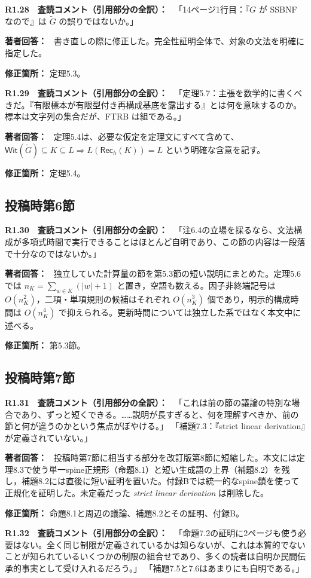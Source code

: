 \documentclass[10pt,a4paper]{ltjsarticle}
\newcommand{\Comment}[1]{\par\medskip\noindent\textbf{#1　査読コメント（引用部分の全訳）：}\ }
\newcommand{\Reply}{\par\noindent\textbf{著者回答：}\ }
\newcommand{\Location}[1]{\par\noindent\textbf{修正箇所：} #1\par}
\newcommand{\Bh}{\mathsf{Rec}_h}
\begin{document}
\Comment{R1.28}
「14ページ1行目：『$G$ が SSBNF なので』は $\widetilde G$ の誤りではないか。」

\Reply
書き直しの際に修正した。完全性証明全体で、対象の文法を明確に指定した。
\Location{定理5.3。}

\Comment{R1.29}
「定理5.7：主張を数学的に書くべきだ。『有限標本が有限型付き再構成基底を露出する』とは何を意味するのか。標本は文字列の集合だが、FTRB は組である。」

\Reply
定理5.4は、必要な仮定を定理文にすべて含めて、
$\mathsf{Wit}(\widetilde G)\subseteq K\subseteq L
\Longrightarrow L(\Bh(K))=L$
という明確な含意を記す。
\Location{定理5.4。}

\subsection*{投稿時第6節}
\Comment{R1.30}
「注6.4の立場を採るなら、文法構成が多項式時間で実行できることはほとんど自明であり、この節の内容は一段落で十分なのではないか。」

\Reply
独立していた計算量の節を第5.3節の短い説明にまとめた。定理5.6では $n_K=\sum_{w\in K}(|w|+1)$ と置き，空語も数える。因子非終端記号は $O(n_K^2)$，二項・単項規則の候補はそれぞれ $O(n_K^3)$ 個であり，明示的構成時間は $O(n_K^4)$ で抑えられる。更新時間については独立した系ではなく本文中に述べる。
\Location{第5.3節。}




\subsection*{投稿時第7節}
\Comment{R1.31}
「これは前の節の議論の特別な場合であり、ずっと短くできる。……説明が長すぎると、何を理解すべきか、前の節と何が違うのかという焦点がぼやける。」
「補題7.3：『strict linear derivation』が定義されていない。」

\Reply
投稿時第7節に相当する部分を改訂版第8節に短縮した。本文には定理8.3で使う単一spine正規形（命題8.1）と短い生成語の上界（補題8.2）を残し，補題8.2には直後に短い証明を置いた。付録Bでは統一的なspine鎖を使って正規化を証明した。未定義だった \emph{strict linear derivation} は削除した。
\Location{命題8.1と周辺の議論、補題8.2とその証明、付録B。}

\Comment{R1.32}
「命題7.2の証明に2ページも使う必要はない。全く同じ制限が定義されているかは知らないが、これは本質的でないことが知られているいくつかの制限の組合せであり、多くの読者は自明か民間伝承的事実として受け入れるだろう。」
「補題7.5と7.6はあまりにも自明である。」
\end{document}
